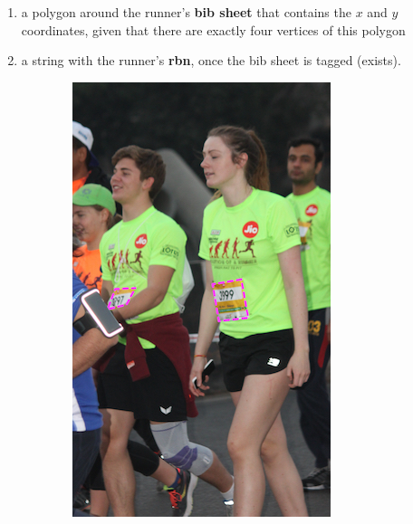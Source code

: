 \begin{enumerate}
  \item a polygon around the runner's \textbf{bib sheet} that contains the $x$ and $y$ coordinates, given that there are exactly four vertices of this polygon
  \item a string with the runner's \textbf{\gls{rbn}}, once the bib sheet is tagged (exists).
\end{enumerate}

\begin{figure}[p]
  \centering
  \hspace{\fill}
  \begin{subfigure}[b]{0.25\textwidth}
    \includegraphics[width=\textwidth]{images/dataset/BibSheet_Detection}

\end{subfigure}
\end{figure}
